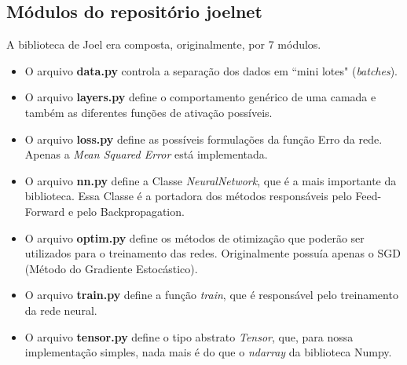 \documentclass[11pt]{article}
\begin{document}
\subsection*{Módulos do repositório joelnet}
A biblioteca de Joel era composta, originalmente, por 7 módulos.
\begin{itemize}
\item O arquivo \textbf{data.py} controla a separação dos dados em ``mini lotes" (\textit{batches}).

\item O arquivo \textbf{layers.py} define o comportamento genérico de uma camada e também as diferentes funções de ativação possíveis.

\item O arquivo \textbf{loss.py} define as possíveis formulações da função Erro da rede. Apenas a \textit{Mean Squared Error} está implementada.

\item O arquivo \textbf{nn.py} define a Classe \textit{NeuralNetwork}, que é a mais importante da biblioteca. Essa Classe é a portadora dos métodos responsáveis pelo Feed-Forward e pelo Backpropagation.

\item O arquivo \textbf{optim.py} define os métodos de otimização que poderão ser utilizados para o treinamento das redes. Originalmente possuía apenas o SGD (Método do Gradiente Estocástico).
\item  O arquivo \textbf{train.py} define a função \textit{train}, que é responsável pelo treinamento da rede neural.

\item O arquivo \textbf{tensor.py} define o tipo abstrato \textit{Tensor}, que, para nossa implementação simples, nada mais é do que o \textit{ndarray} da biblioteca Numpy.
\end{itemize}
\end{document}

